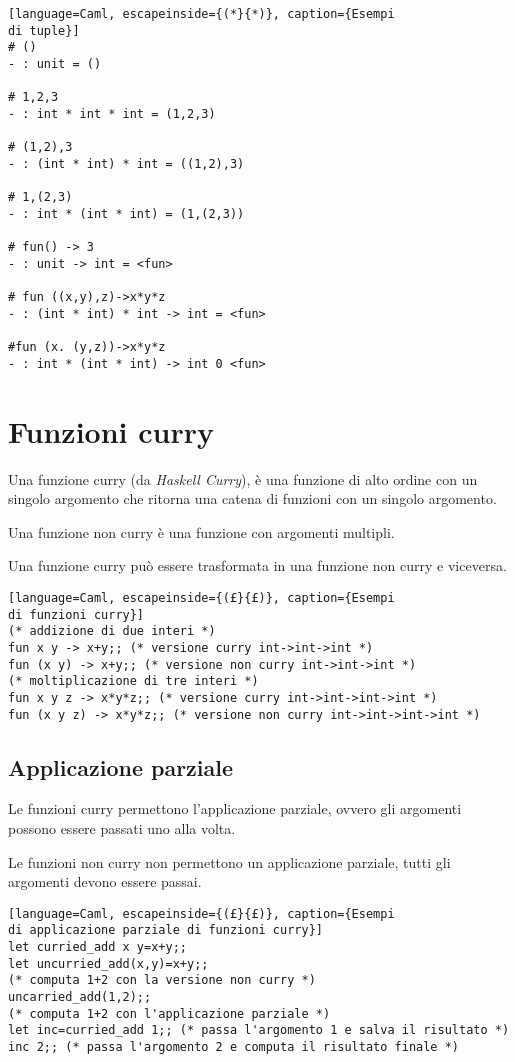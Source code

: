 \begin{lstlisting}[language=Caml, escapeinside={(*}{*)}, caption={Esempi
di tuple}]
# ()
- : unit = ()

# 1,2,3
- : int * int * int = (1,2,3)

# (1,2),3
- : (int * int) * int = ((1,2),3)

# 1,(2,3)
- : int * (int * int) = (1,(2,3))

# fun() -> 3
- : unit -> int = <fun>

# fun ((x,y),z)->x*y*z
- : (int * int) * int -> int = <fun>

#fun (x. (y,z))->x*y*z
- : int * (int * int) -> int 0 <fun>
\end{lstlisting}

\section{Funzioni curry}
\begin{theorem}
  Una funzione curry (da \emph{Haskell Curry}), è una funzione di alto
  ordine con un singolo argomento che ritorna una catena di funzioni con
  un singolo argomento.

  Una funzione non curry è una funzione con argomenti multipli.
\end{theorem}

Una funzione curry può essere trasformata in una funzione non curry e
viceversa.

\begin{lstlisting}[language=Caml, escapeinside={(£}{£)}, caption={Esempi
di funzioni curry}]
(* addizione di due interi *)
fun x y -> x+y;; (* versione curry int->int->int *)
fun (x y) -> x+y;; (* versione non curry int->int->int *)
(* moltiplicazione di tre interi *)
fun x y z -> x*y*z;; (* versione curry int->int->int->int *)
fun (x y z) -> x*y*z;; (* versione non curry int->int->int->int *)
\end{lstlisting}

\subsection{Applicazione parziale}
Le funzioni curry permettono l'applicazione parziale, ovvero gli argomenti
possono essere passati uno alla volta.

Le funzioni non curry non permettono un applicazione parziale, tutti gli
argomenti devono essere passai.
\begin{lstlisting}[language=Caml, escapeinside={(£}{£)}, caption={Esempi
di applicazione parziale di funzioni curry}]
let curried_add x y=x+y;;
let uncurried_add(x,y)=x+y;;
(* computa 1+2 con la versione non curry *)
uncarried_add(1,2);;
(* computa 1+2 con l'applicazione parziale *)
let inc=curried_add 1;; (* passa l'argomento 1 e salva il risultato *)
inc 2;; (* passa l'argomento 2 e computa il risultato finale *)
\end{lstlisting}

